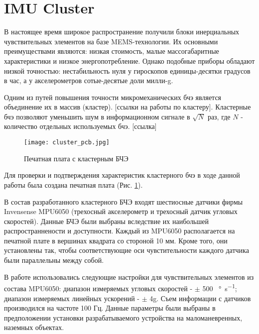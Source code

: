 \section {IMU Cluster}
В настоящее время широкое распространение получили блоки инерциальных чувствительных элементов на базе MEMS-технологии.
Их основными преимуществами являются: низкая стоимость, малые массогабаритные характеристики и низкое энергопотребление.
Однако подобные приборы обладают низкой точностью: нестабильность нуля у гироскопов единицы-десятки градусов в час, а у акселерометров сотые-десятые доли милли-g.

Одним из путей повышения точности микромеханических бчэ является объединение их в массив (кластер). [ссылки на работы по кластеру].
Кластерные бчэ позволяют уменьшить шум в информационном сигнале в $\sqrt{N}$ раз, где $N$ - количество отдельных используемых бчэ. [ссылка]

\newpage

\begin{figure}[h!]
	\centering
	\texttt{[image: cluster\_pcb.jpg]}
	\caption{Печатная плата с кластерным БЧЭ}
	\label{fig:cluster_pcb}
\end{figure}

Для проверки и подтверждения характеристик кластерного бчэ в ходе данной работы была создана печатная плата (Рис. \ref{fig:cluster_pcb}).

В состав разработанного кластерного БЧЭ входят шестиосные датчики фирмы Invensense MPU6050 (трехосный акселерометр и трехосный датчик угловых скоростей).
Данные БЧЭ были выбраны вследствие их наибольшей распространнености и доступности.
Каждый из MPU6050 располагается на печатной плате в вершинах квадрата со стороной 10 мм.
Кроме того, они установлены так, чтобы соответствующие оси чувстительности каждого датчика были параллельны между собой.

В работе использовались следующие настройки для чувствительных элементов из состава MPU6050: диапазон измеряемых угловых скоростей - $\pm$ 500 \SI[per-mode=symbol]{}{\degree\per\second};
диапазон измеряемых линейных ускорений - $\pm$ 4g. Съем информации с датчиков производился на частоте 100 Гц.
Данные параметры были выбраны в предположении установки разрабатываемого устройства на маломаневренных, наземных объектах.


